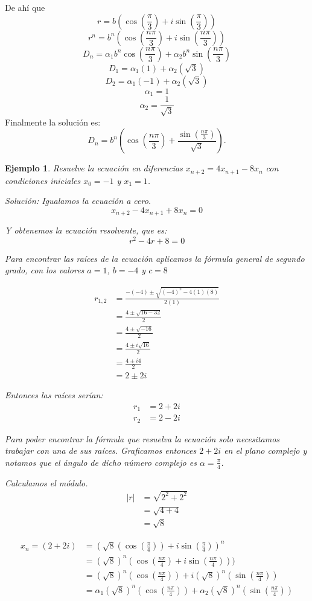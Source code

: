\documentclass{report}
\newtheorem{ejemplo}{Ejemplo}
\begin{document}
De ahí que
  $$r=b(\cos(\frac{\pi}{3})+i\sin(\frac{\pi}{3}))$$
  $$r^n=b^n(\cos(\frac{n\pi}{3})+i\sin(\frac{n\pi}{3}))$$
  $$D_{n}=\alpha_{1}b^n\cos(\frac{n\pi}{3})+\alpha_{2}b^n\sin(\frac{n\pi}{3})$$
  $$D_{1}=\alpha_{1}(1)+\alpha_{2}(\sqrt{3})$$
  $$D_{2}=\alpha_{1}(-1)+\alpha_{2}(\sqrt{3})$$
  $$\alpha_{1}=1$$
  $$\alpha_{2}=\frac{1}{\sqrt{3}}$$
Finalmente la solución es:
\begin{equation}
  \label{solucion determinante2}
D_{n}=b^n(\cos(\frac{n\pi}{3})+\frac{\sin(\frac{n\pi}{3})}{\sqrt{3}}).
\end{equation}

\begin{ejemplo}
Resuelve la ecuación en diferencias $x_{n+2}=4x_{n+1}-8x_n$ con condiciones iniciales $x_0=-1$ y $x_1=1$.

\textit{Solución:} 
Igualamos la ecuación a cero.
$$x_{n+2}-4x_{n+1}+8x_n=0$$

Y obtenemos la ecuación resolvente, que es: 
$$r^2-4r+8=0$$

Para encontrar las raíces de la ecuación aplicamos la fórmula general de segundo grado, con los valores $a=1$, $b=-4$ y $c=8$

\begin{align*}
  r_{1,2}&=\frac{-(-4)\pm\sqrt{(-4)^2-4(1)(8)}}{2(1)}\\
  &=\frac{4\pm\sqrt{16-32}}{2}\\
  &=\frac{4\pm\sqrt{-16}}{2}\\
  &=\frac{4\pm i\sqrt{16}}{2}\\
  &=\frac{4\pm i4}{2}\\
  &=2\pm 2i
\end{align*}

Entonces las raíces serían:
\begin{align*}
  r_1&=2+2i\\
  r_2&=2-2i
\end{align*}

Para poder encontrar la fórmula que resuelva la ecuación solo necesitamos trabajar con una de sus raíces. Graficamos entonces $2+2i$ en el plano complejo y notamos que el ángulo de dicho número complejo es $\alpha=\frac{\pi}{4}$.

Calculamos el módulo.
\begin{align*}
  |r|&=\sqrt{2^2+2^2}\\
     &=\sqrt{4+4}\\
     &=\sqrt{8}
\end{align*}

\begin{align*}
  x_n=(2+2i)&=(\sqrt{8}(\cos(\frac{\pi}{4}))+i \sin(\frac{\pi}{4}))^n\\
  &=(\sqrt{8})^n(\cos(\frac{n\pi}{4})+i \sin(\frac{n\pi}{4})))\\
  &=(\sqrt{8})^n(\cos(\frac{n\pi}{4}))+i (\sqrt{8})^n(\sin(\frac{n\pi}{4}))\\
  &=\alpha_1(\sqrt{8})^n(\cos(\frac{n\pi}{4}))+\alpha_2(\sqrt{8})^n(\sin(\frac{n\pi}{4}))
\end{align*}


\end{ejemplo}
\end{document}
